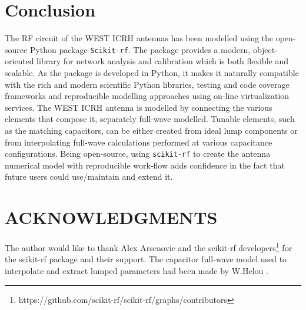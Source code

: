 \documentclass[%
aip,
cp,  %
amsmath,amssymb,%
reprint,%
]{revtex4-2}
\begin{document}
	\section{Conclusion}
	The RF circuit of the WEST ICRH antennas has been modelled using the open-source Python package \texttt{Scikit-rf}. The package provides a modern, object-oriented library for network analysis and calibration which is both flexible and scalable. As the package is developed in Python, it makes it naturally compatible with the rich and modern scientific Python libraries, testing and code coverage frameworks and reproducible modelling approaches using on-line virtualization services. The WEST ICRH antenna is modelled by connecting the various elements that compose it, separately full-wave modelled. Tunable elements, such as the matching capacitors, can be either created from ideal lump components or from interpolating full-wave calculations performed at various capacitance configurations. Being open-source, using \texttt{scikit-rf} to create the antenna numerical model with reproducible work-flow adds confidence in the fact that future users could use/maintain and extend it.
	
	
	\section{ACKNOWLEDGMENTS}
	The author would like to thank Alex Arsenovic and the  scikit-rf developers\footnote{https://github.com/scikit-rf/scikit-rf/graphs/contributors} for the scikit-rf package and their support. The capacitor full-wave model used to interpolate and extract lumped parameters had been made by W.Helou \cite{Helou2018PhD}.
	
	
\end{document}
